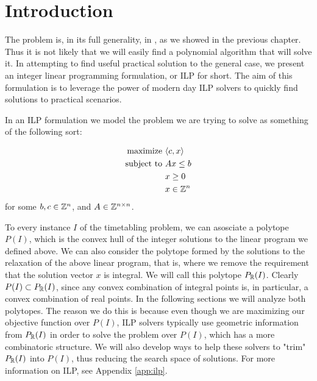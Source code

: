 \section{Introduction}
The problem is, in its full generality, in \npc, as we showed in the previous chapter. Thus it is not likely that we will easily find a polynomial algorithm that will solve it. In attempting to find useful practical solution to the general case, we present an integer linear programming formulation, or ILP for short. The aim of this formulation is to leverage the power of modern day ILP solvers to quickly find solutions to practical scenarios.

In an ILP formulation we model the problem we are trying to solve as something of the following sort:

\begin{alignat*}{2}
\text{maximize } & \langle c, x \rangle\\
\text{subject to } & A x \le b\\
                   & x \ge 0\\
                   & x \in \mathbb{Z}^n
\end{alignat*}
for some $b, c \in \mathbb{Z}^n$, and $A \in \mathbb{Z}^{n \times n}$.

To every instance $I$ of the timetabling problem, we can asosciate a polytope $P(I)$, which is the convex hull of the integer solutions to the linear program we defined above. We can also consider the polytope formed by the solutions to the relaxation of the above linear program, that is, where we remove the requirement that the solution vector $x$ is integral. We will call this polytope $P_{\mathbb{R}}(I)$. Clearly  $P(I) \subset P_{\mathbb{R}}(I)$, since any convex combination of integral points is, in particular, a convex combination of real points. In the following sections we will analyze both polytopes. The reason we do this is because even though we are maximizing our objective function over $P(I)$, ILP solvers typically use geometric information from $P_{\mathbb{R}}(I)$ in order to solve the problem over $P(I)$, which has a more combinatoric structure. We will also develop ways to help these solvers to "trim" $P_{\mathbb{R}}(I)$ into $P(I)$, thus reducing the search space of solutions. For more information on ILP, see Appendix \ref{app:ilp}.
